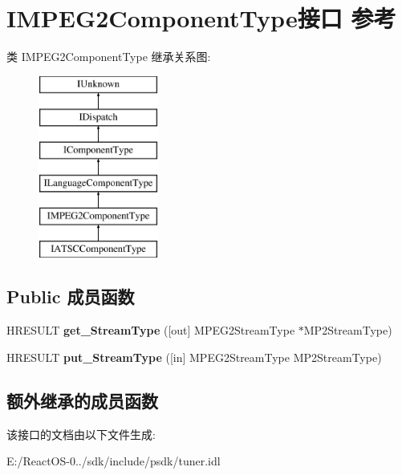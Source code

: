 \hypertarget{interface_i_m_p_e_g2_component_type}{}\section{I\+M\+P\+E\+G2\+Component\+Type接口 参考}
\label{interface_i_m_p_e_g2_component_type}
类 I\+M\+P\+E\+G2\+Component\+Type 继承关系图\+:\begin{figure}[H]
\begin{center}
\leavevmode
\includegraphics[height=6.000000cm]{interface_i_m_p_e_g2_component_type}
\end{center}
\end{figure}
\subsection*{Public 成员函数}
\begin{DoxyCompactItemize}
\item 
\mbox{\label{interface_i_m_p_e_g2_component_type_a1577d1543f33c3ef79dec1a9cb40a0f3}} 
H\+R\+E\+S\+U\+LT {\bfseries get\+\_\+\+Stream\+Type} (\mbox{[}out\mbox{]} M\+P\+E\+G2\+Stream\+Type $\ast$M\+P2\+Stream\+Type)
\item 
\mbox{\label{interface_i_m_p_e_g2_component_type_a536f7b5902ce9bc60434b8964146a20e}} 
H\+R\+E\+S\+U\+LT {\bfseries put\+\_\+\+Stream\+Type} (\mbox{[}in\mbox{]} M\+P\+E\+G2\+Stream\+Type M\+P2\+Stream\+Type)
\end{DoxyCompactItemize}
\subsection*{额外继承的成员函数}


该接口的文档由以下文件生成\+:\begin{DoxyCompactItemize}
\item 
E\+:/\+React\+O\+S-\/0../sdk/include/psdk/tuner.\+idl\end{DoxyCompactItemize}
